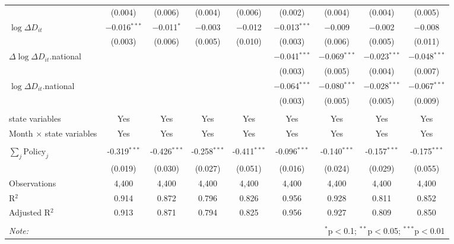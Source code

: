 \begin{tabular}{@{\extracolsep{1pt}}lcccccccc}
  & (0.004) & (0.006) & (0.004) & (0.006) & (0.002) & (0.004) & (0.004) & (0.005) \\ 
  $\log \Delta D_{it}$ & $-$0.016$^{***}$ & $-$0.011$^{*}$ & $-$0.003 & $-$0.012 & $-$0.013$^{***}$ & $-$0.009 & $-$0.002 & $-$0.008 \\ 
  & (0.003) & (0.006) & (0.005) & (0.010) & (0.003) & (0.006) & (0.005) & (0.011) \\ 
  $\Delta \log \Delta D_{it}$.national &  &  &  &  & $-$0.041$^{***}$ & $-$0.069$^{***}$ & $-$0.023$^{***}$ & $-$0.048$^{***}$ \\ 
  &  &  &  &  & (0.003) & (0.005) & (0.004) & (0.007) \\ 
  $\log \Delta D_{it}$.national &  &  &  &  & $-$0.064$^{***}$ & $-$0.080$^{***}$ & $-$0.028$^{***}$ & $-$0.067$^{***}$ \\ 
  &  &  &  &  & (0.003) & (0.005) & (0.005) & (0.009) \\ 
 \hline \\[-1.8ex] 
state variables & Yes & Yes & Yes & Yes & Yes & Yes & Yes & Yes \\ 
Month $\times$ state variables & Yes & Yes & Yes & Yes & Yes & Yes & Yes & Yes \\ 
\hline \\[-1.8ex] 
$\sum_j \mathrm{Policy}_j$ & -0.319$^{***}$ & -0.426$^{***}$ & -0.258$^{***}$ & -0.411$^{***}$ & -0.096$^{***}$ & -0.140$^{***}$ & -0.157$^{***}$ & -0.175$^{***}$ \\ 
 & (0.019) & (0.030) & (0.027) & (0.051) & (0.016) & (0.024) & (0.029) & (0.055) \\ 
Observations & 4,400 & 4,400 & 4,400 & 4,400 & 4,400 & 4,400 & 4,400 & 4,400 \\ 
R$^{2}$ & 0.914 & 0.872 & 0.796 & 0.826 & 0.956 & 0.928 & 0.811 & 0.852 \\ 
Adjusted R$^{2}$ & 0.913 & 0.871 & 0.794 & 0.825 & 0.956 & 0.927 & 0.809 & 0.850 \\ 
\hline 
\hline \\[-1.8ex] 
\textit{Note:}  & \multicolumn{8}{r}{$^{*}$p$<$0.1; $^{**}$p$<$0.05; $^{***}$p$<$0.01} \\ 
\end{tabular} 